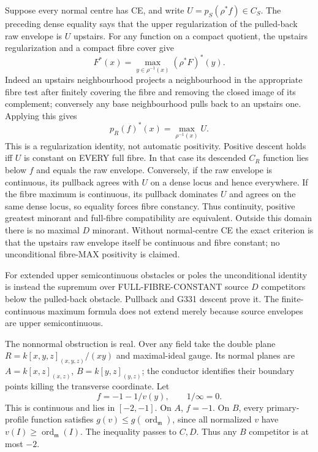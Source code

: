 \documentclass[11pt]{article}
\begin{document}
Suppose every normal centre has CE, and write \(U=p_S(\rho^*f)\in C_S\). The preceding dense equality says that the upper regularization of the pulled-back raw envelope is \(U\) upstairs. For any function on a compact quotient, the upstairs regularization and a compact fibre cover give
\[
F^*(x)=\max_{y\in\rho^{-1}(x)}(\rho^*F)^*(y).
\]
Indeed an upstairs neighbourhood projects a neighbourhood in the appropriate fibre test after finitely covering the fibre and removing the closed image of its complement; conversely any base neighbourhood pulls back to an upstairs one. Applying this gives
\[
p_R(f)^*(x)=\max_{\rho^{-1}(x)}U.
\]
This is a regularization identity, not automatic positivity. Positive descent holds iff \(U\) is constant on EVERY full fibre. In that case its descended \(C_R\) function lies below \(f\) and equals the raw envelope. Conversely, if the raw envelope is continuous, its pullback agrees with \(U\) on a dense locus and hence everywhere. If the fibre maximum is continuous, its pullback dominates \(U\) and agrees on the same dense locus, so equality forces fibre constancy. Thus continuity, positive greatest minorant and full-fibre compatibility are equivalent. Outside this domain there is no maximal \(D\) minorant. Without normal-centre CE the exact criterion is that the upstairs raw envelope itself be continuous and fibre constant; no unconditional fibre-MAX positivity is claimed.

For extended upper semicontinuous obstacles or poles the unconditional identity is instead the supremum over FULL-FIBRE-CONSTANT source \(D\) competitors below the pulled-back obstacle. Pullback and G331 descent prove it. The finite-continuous maximum formula does not extend merely because source envelopes are upper semicontinuous.

The nonnormal obstruction is real. Over any field take the double plane \(R=k[x,y,z]_{(x,y,z)}/(xy)\) and maximal-ideal gauge. Its normal planes are \(A=k[x,z]_{(x,z)}\), \(B=k[y,z]_{(y,z)}\); the conductor identifies their boundary points killing the transverse coordinate. Let
\[
f=-1-1/v(y),\qquad 1/\infty=0.
\]
This is continuous and lies in \([-2,-1]\). On \(A\), \(f=-1\). On \(B\), every primary-profile function satisfies \(g(v)\le g(\operatorname{ord}_{\mathfrak m})\), since all normalized \(v\) have \(v(I)\ge\operatorname{ord}_{\mathfrak m}(I)\). The inequality passes to \(C,D\). Thus any \(B\) competitor is at most \(-2\).
\end{document}
